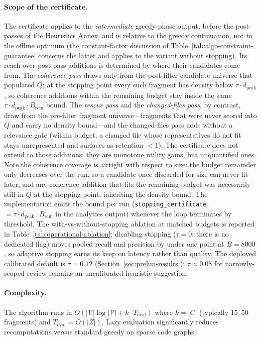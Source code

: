\documentclass[11pt, a4paper]{article}
\begin{document}
\paragraph{Scope of the certificate.} The certificate applies to the \emph{intermediate} greedy-phase output, before the post-passes of the Heuristics Annex, and is relative to the greedy continuation, not to the offline optimum (the constant-factor discussion of Table~\ref{tab:algo-constraint-guarantee} concerns the latter and applies to the variant without stopping). Its reach over post-pass additions is determined by where their candidates come from. The \emph{coherence pass} draws only from the post-filter candidate universe that populated $Q$; at the stopping point every such fragment has density below $\tau \cdot d_{\mathrm{peak}}$, so coherence additions within the remaining budget stay inside the same $\tau \cdot d_{\mathrm{peak}} \cdot B_{\mathrm{rem}}$ bound. The \emph{rescue pass} and the \emph{changed-files pass}, by contrast, draw from the pre-filter fragment universe---fragments that were never scored into $Q$ and carry no density bound---and the changed-files pass adds without a relevance gate (within budget; a changed file whose representatives do not fit stays unrepresented and surfaces as retention $<1$). The certificate does not extend to those additions; they are monotone utility gains, but unquantified ones. Note the coherence coverage is airtight with respect to size: the budget remainder only decreases over the run, so a candidate once discarded for size can never fit later, and any coherence addition that fits the remaining budget was necessarily still in $Q$ at the stopping point, inheriting the density bound. The implementation emits the bound per run (\texttt{stopping\_certificate} $= \tau \cdot d_{\mathrm{peak}} \cdot B_{\mathrm{rem}}$ in the analytics output) whenever the loop terminates by threshold. The with-vs-without-stopping ablation at matched budgets is reported in Table~\ref{tab:operational-ablation}: disabling stopping ($\tau{=}0$, there is no dedicated flag) moves pooled recall and precision by under one point at $B{=}8000$, so adaptive stopping earns its keep on latency rather than quality. The deployed calibrated default is $\tau = 0.12$ (Section~\ref{sec:prelim-results}); $\tau \approx 0.08$ for narrowly-scoped review remains an uncalibrated heuristic suggestion.

\paragraph{Complexity.}
The algorithm runs in $O(|\mathcal{V}| \log |\mathcal{V}| + k \cdot T_{\text{eval}})$ where $k = |C|$ (typically 15--50 fragments) and $T_{\text{eval}} = O(|Z|)$. Lazy evaluation significantly reduces recomputations versus standard greedy on sparse code graphs.
\end{document}
